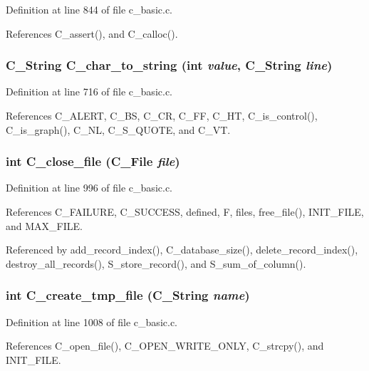 Definition at line 844 of file c\_\-basic.c.

References C\_\-assert(), and C\_\-calloc().
\subsubsection{\setlength{\rightskip}{0pt plus 5cm}\bf{C\_\-String} C\_\-char\_\-to\_\-string (int {\em value}, \bf{C\_\-String} {\em line})}\label{c__basic_8c_4a4051a87546f31b2c503a6993cb04c4}




Definition at line 716 of file c\_\-basic.c.

References C\_\-ALERT, C\_\-BS, C\_\-CR, C\_\-FF, C\_\-HT, C\_\-is\_\-control(), C\_\-is\_\-graph(), C\_\-NL, C\_\-S\_\-QUOTE, and C\_\-VT.
\subsubsection{\setlength{\rightskip}{0pt plus 5cm}int C\_\-close\_\-file (\bf{C\_\-File} {\em file})}\label{c__basic_8c_f4d38ec731805345c3c69f7e8f8c11a9}




Definition at line 996 of file c\_\-basic.c.

References C\_\-FAILURE, C\_\-SUCCESS, defined, F, files, free\_\-file(), INIT\_\-FILE, and MAX\_\-FILE.

Referenced by add\_\-record\_\-index(), C\_\-database\_\-size(), delete\_\-record\_\-index(), destroy\_\-all\_\-records(), S\_\-store\_\-record(), and S\_\-sum\_\-of\_\-column().
\subsubsection{\setlength{\rightskip}{0pt plus 5cm}int C\_\-create\_\-tmp\_\-file (\bf{C\_\-String} {\em name})}\label{c__basic_8c_455cced69dcdf91ef61e9d74e1c0bc57}




Definition at line 1008 of file c\_\-basic.c.

References C\_\-open\_\-file(), C\_\-OPEN\_\-WRITE\_\-ONLY, C\_\-strcpy(), and INIT\_\-FILE.

